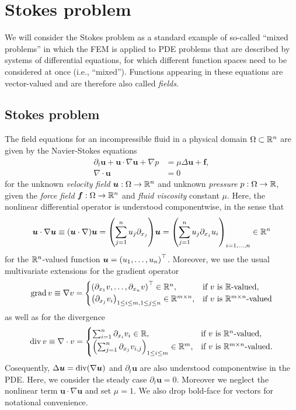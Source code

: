 \section{Stokes problem}

We will consider the Stokes problem as a standard example of so-called ``mixed problems'' in which the FEM is applied to PDE problems that are described by systems of differential equations, for which different function spaces need to be considered at once (i.e., ``mixed'').
Functions appearing in these equations are vector-valued and are therefore also called \emph{fields}.


\subsection{Stokes problem}

The field equations for an incompressible fluid in a physical domain \(\Omega \subset \R^n\) are given by the Navier-Stokes equations
\begin{align*}
	\partial_t \bm{u} + \bm{u} \cdot \nabla\bm{u} + \nabla p &= \mu\Delta \bm{u} + \bm{f},\\
	\nabla \cdot \bm{u} &= 0
\end{align*}
for the unknown \emph{velocity field} \(\bm{u}: \Omega \to \R^n\) and unknown \emph{pressure} \(p: \Omega \to \R\), given the \emph{force field} \(\bm{f}: \Omega \to \R^n\) and \emph{fluid viscosity} constant \(\mu\).
Here, the nonlinear differential operator is understood componentwise, in the sense that
\[
	\bm{u} \cdot \nabla \bm{u} \equiv \parentheses*{\bm{u} \cdot \nabla}\bm{u} = \parentheses*{\sum_{j = 1}^n u_j \partial_{x_j}}\bm{u} = \parentheses*{\sum_{j = 1}^n u_j \partial_{x_j}u_i}_{i = 1, \ldots, n} \in \R^n
\]
for the \(\R^n\)-valued function \(\bm{u} = \parentheses*{u_1, \ldots, u_n}^\top\).
Moreover, we use the usual multivariate extensions for the gradient operator
\[
	\grad v \equiv \nabla v = \begin{cases}
		\parentheses*{\partial_{x_1}v, \ldots, \partial_{x_n}v}^\top \in \R^n, & \text{if }v\text{ is }\R\text{-valued},\\
		\parentheses*{\partial_{x_j}v_i}_{1 \le i \le m, 1 \le j \le n} \in \R^{m \times n}, & \text{if }v\text{ is }\R^{m \times n}\text{-valued}
	\end{cases}
\]
as well as for the divergence
\[
	\div v \equiv \nabla \cdot v = \begin{cases}
		\sum_{i = 1}^n \partial_{x_i}v_i \in \R, & \text{if }v\text{ is }\R^n\text{-valued},\\
		\parentheses*{\sum_{j = 1}^n \partial_{x_j}v_{i, j}}_{1 \le i \le m} \in \R^m, & \text{if }v\text{ is }\R^{m \times n}\text{-valued}.
	\end{cases}
\]
Cosequently, \(\Delta \bm{u} = \div\parentheses*{\nabla \bm{u}}\) and \(\partial_t \bm{u}\) are also understood componentwise in the PDE.
Here, we consider the steady case \(\partial_t \bm{u} = 0\).
Moreover we neglect the nonlinear term \(\bm{u} \cdot \nabla\bm{u}\) and set \(\mu = 1\).
We also drop bold-face for vectors for notational convenience.

